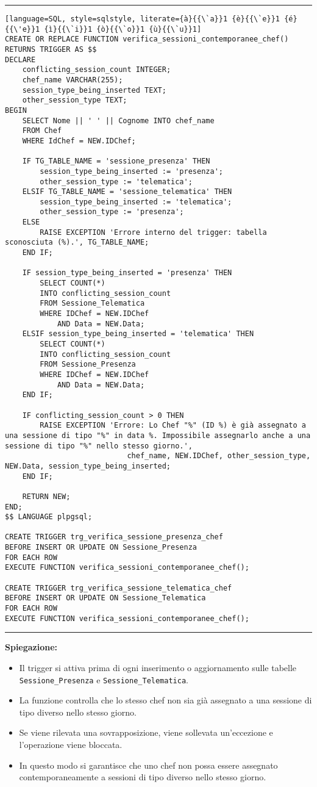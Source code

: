 \noindent\rule{\textwidth}{0.4pt}
\begin{lstlisting}[language=SQL, style=sqlstyle, literate={à}{{\`a}}1 {è}{{\`e}}1 {é}{{\'e}}1 {ì}{{\`i}}1 {ò}{{\`o}}1 {ù}{{\`u}}1]
CREATE OR REPLACE FUNCTION verifica_sessioni_contemporanee_chef()
RETURNS TRIGGER AS $$
DECLARE
    conflicting_session_count INTEGER;
    chef_name VARCHAR(255);
    session_type_being_inserted TEXT;
    other_session_type TEXT;
BEGIN
    SELECT Nome || ' ' || Cognome INTO chef_name
    FROM Chef
    WHERE IdChef = NEW.IDChef;

    IF TG_TABLE_NAME = 'sessione_presenza' THEN
        session_type_being_inserted := 'presenza';
        other_session_type := 'telematica';
    ELSIF TG_TABLE_NAME = 'sessione_telematica' THEN
        session_type_being_inserted := 'telematica';
        other_session_type := 'presenza';
    ELSE
        RAISE EXCEPTION 'Errore interno del trigger: tabella sconosciuta (%).', TG_TABLE_NAME;
    END IF;

    IF session_type_being_inserted = 'presenza' THEN
        SELECT COUNT(*)
        INTO conflicting_session_count
        FROM Sessione_Telematica
        WHERE IDChef = NEW.IDChef
            AND Data = NEW.Data;
    ELSIF session_type_being_inserted = 'telematica' THEN
        SELECT COUNT(*)
        INTO conflicting_session_count
        FROM Sessione_Presenza
        WHERE IDChef = NEW.IDChef
            AND Data = NEW.Data;
    END IF;

    IF conflicting_session_count > 0 THEN
        RAISE EXCEPTION 'Errore: Lo Chef "%" (ID %) è già assegnato a una sessione di tipo "%" in data %. Impossibile assegnarlo anche a una sessione di tipo "%" nello stesso giorno.',
                            chef_name, NEW.IDChef, other_session_type, NEW.Data, session_type_being_inserted;
    END IF;

    RETURN NEW;
END;
$$ LANGUAGE plpgsql;

CREATE TRIGGER trg_verifica_sessione_presenza_chef
BEFORE INSERT OR UPDATE ON Sessione_Presenza
FOR EACH ROW
EXECUTE FUNCTION verifica_sessioni_contemporanee_chef();

CREATE TRIGGER trg_verifica_sessione_telematica_chef
BEFORE INSERT OR UPDATE ON Sessione_Telematica
FOR EACH ROW
EXECUTE FUNCTION verifica_sessioni_contemporanee_chef();
\end{lstlisting}
\noindent\rule{\textwidth}{0.4pt}

\textbf{Spiegazione:}
\begin{itemize}
    \item Il trigger si attiva prima di ogni inserimento o aggiornamento sulle tabelle \texttt{Sessione\_Presenza} e \texttt{Sessione\_Telematica}.
    \item La funzione controlla che lo stesso chef non sia già assegnato a una sessione di tipo diverso nello stesso giorno.
    \item Se viene rilevata una sovrapposizione, viene sollevata un'eccezione e l'operazione viene bloccata.
    \item In questo modo si garantisce che uno chef non possa essere assegnato contemporaneamente a sessioni di tipo diverso nello stesso giorno.
\end{itemize}


